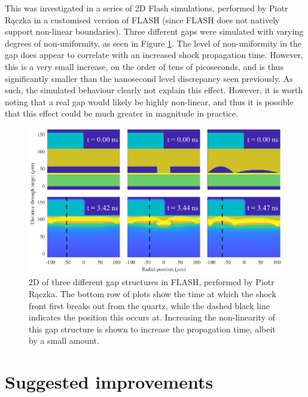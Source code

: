 This was investigated in a series of 2D Flash simulations, performed by Piotr R\k{a}czka in a customised version of FLASH (since FLASH does not natively support non-linear boundaries). Three different gaps were simulated with varying degrees of non-uniformity, as seen in Figure \ref{fig:GapSims}. The level of non-uniformity in the gap does appear to correlate with an increased shock propagation time. However, this is a very small increase, on the order of tens of picoseconds, and is thus significantly smaller than the nanosecond level discrepancy seen previously. As such, the simulated behaviour clearly not explain this effect. However, it is worth noting that a real gap would likely be highly non-linear, and thus it is possible that this effect could be much greater in magnitude in practice.

\begin{figure} [h!]
\begin{centering}
\includegraphics[width=1\textwidth]{figures/Experiment/GapSims.eps}%
\caption{\label{fig:GapSims} 2D of three different gap structures in FLASH, performed by Piotr R\k{a}czka. The bottom row of plots show the time at which the shock front first breaks out from the quartz, while the dashed black line indicates the position this occurs at. Increasing the non-linearity of this gap structure is shown to increase the propagation time, albeit by a small amount.}
\end{centering}
\end{figure}

\section{Suggested improvements} \label{Suggested Improvements}

